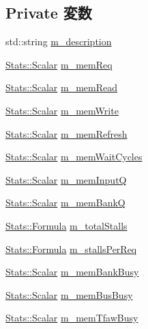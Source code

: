 \subsection*{Private 変数}
\begin{DoxyCompactItemize}
\item 
std::string \hyperlink{classMemCntrlProfiler_ad50eef5f7fcfa30f62e14f0fac2a4f6e}{m\_\-description}
\item 
\hyperlink{classStats_1_1Scalar}{Stats::Scalar} \hyperlink{classMemCntrlProfiler_a0db47e3be3f4c5854db27253aea6870e}{m\_\-memReq}
\item 
\hyperlink{classStats_1_1Scalar}{Stats::Scalar} \hyperlink{classMemCntrlProfiler_a0c75e79c6b3b4045df78fe3d2a3818ba}{m\_\-memRead}
\item 
\hyperlink{classStats_1_1Scalar}{Stats::Scalar} \hyperlink{classMemCntrlProfiler_a74fd35ce5bd6bc28dd0c352ecb1aa18f}{m\_\-memWrite}
\item 
\hyperlink{classStats_1_1Scalar}{Stats::Scalar} \hyperlink{classMemCntrlProfiler_aa9a311591571ea2d6786ac78d91cf615}{m\_\-memRefresh}
\item 
\hyperlink{classStats_1_1Scalar}{Stats::Scalar} \hyperlink{classMemCntrlProfiler_a8d5bfd0366a14a00a9bb4728c6a3ed0c}{m\_\-memWaitCycles}
\item 
\hyperlink{classStats_1_1Scalar}{Stats::Scalar} \hyperlink{classMemCntrlProfiler_a3d82fdd9cbe9c65a1c20bf72792294d3}{m\_\-memInputQ}
\item 
\hyperlink{classStats_1_1Scalar}{Stats::Scalar} \hyperlink{classMemCntrlProfiler_ad82b0567b740c4c884c8755d5761fdf2}{m\_\-memBankQ}
\item 
\hyperlink{classStats_1_1Formula}{Stats::Formula} \hyperlink{classMemCntrlProfiler_a505cbdb7eb24fd8426a2c6a864e7aba7}{m\_\-totalStalls}
\item 
\hyperlink{classStats_1_1Formula}{Stats::Formula} \hyperlink{classMemCntrlProfiler_aa57a4835e0f5b5c96bd2d9bd11346e3f}{m\_\-stallsPerReq}
\item 
\hyperlink{classStats_1_1Scalar}{Stats::Scalar} \hyperlink{classMemCntrlProfiler_a3b815569ddd695019996da1170176e76}{m\_\-memBankBusy}
\item 
\hyperlink{classStats_1_1Scalar}{Stats::Scalar} \hyperlink{classMemCntrlProfiler_a5cc9f8f8bf9f8a7b1c73a2c435764d87}{m\_\-memBusBusy}
\item 
\hyperlink{classStats_1_1Scalar}{Stats::Scalar} \hyperlink{classMemCntrlProfiler_a25f08f34fa04d722e7b39edd23299620}{m\_\-memTfawBusy}
\item 

\end{DoxyCompactItemize}
